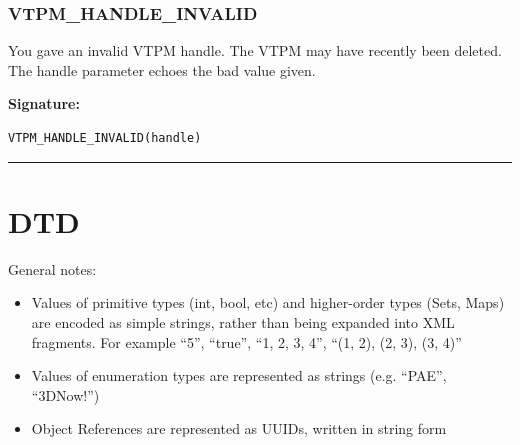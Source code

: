 \subsubsection{VTPM\_HANDLE\_INVALID}

You gave an invalid VTPM handle.  The VTPM may have recently been deleted. 
The handle parameter echoes the bad value given.

\vspace{0.3cm}
{\bf Signature:}
\begin{verbatim}VTPM_HANDLE_INVALID(handle)\end{verbatim}
\begin{center}\rule{10em}{0.1pt}\end{center}



\newpage
\section{DTD}
General notes:
\begin{itemize}
\item Values of primitive types (int, bool, etc) and higher-order types (Sets, Maps) are encoded as simple strings, rather than being expanded into XML fragments. For example ``5'', ``true'', ``1, 2, 3, 4'', ``(1, 2), (2, 3), (3, 4)''
\item Values of enumeration types are represented as strings (e.g. ``PAE'', ``3DNow!'')
\item Object References are represented as UUIDs, written in string form
\end{itemize}
